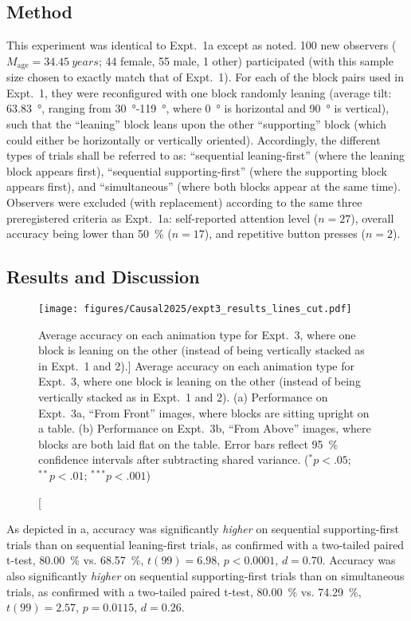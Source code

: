 \subsection{Method}
This experiment was identical to Expt.~1a except as noted.  100 new observers ($M_\text{age} = \qty{34.45}{years}$; 44 female, 55 male, 1 other) participated (with this sample size chosen to exactly match that of Expt.~1).  For each of the block pairs used in Expt.~1, they were reconfigured with one block randomly leaning (average tilt: \qty{63.83}{\degree}, ranging from \qty{30}{\degree}-\qty{119}{\degree}, where \qty{0}{\degree} is horizontal and \qty{90}{\degree} is vertical), such that the “leaning” block leans upon the other “supporting” block (which could either be horizontally or vertically oriented).  Accordingly, the different types of trials shall be referred to as: “sequential leaning-first” (where the leaning block appears first), “sequential supporting-first” (where the supporting block appears first), and “simultaneous” (where both blocks appear at the same time). Observers were excluded (with replacement) according to the same three preregistered criteria as Expt.~1a: self-reported attention level ($n = 27$), overall accuracy being lower than \qty{50}{\percent} ($n = 17$), and repetitive button presses ($n = 2$).
\subsection{Results and Discussion}
\begin{figure}[ht]
    \centering
    \texttt{[image: figures/Causal2025/expt3\_results\_lines\_cut.pdf]}
    \caption
    [Average accuracy on each animation type for Expt.~3, where one block is leaning on the other (instead of being vertically stacked as in Expt.~1 and 2).]
    {Average accuracy on each animation type for Expt.~3, where one block is leaning on the other (instead of being vertically stacked as in Expt.~1 and 2).  (a) Performance on Expt.~3a, “From Front” images, where blocks are sitting upright on a table.  (b) Performance on Expt.~3b, “From Above” images, where blocks are both laid flat on the table.  Error bars reflect \qty{95}{\percent} confidence intervals after subtracting shared variance. ($^{*}p < .05$; $^{**}p < .01$;  $^{***}p < .001$)}
    \label{fig:CausalHist_6}
\end{figure}
As depicted in a, accuracy was significantly \textit{higher} on sequential supporting-first trials than on sequential leaning-first trials, as confirmed with a two-tailed paired t-test, \qty{80.00}{\percent} vs. \qty{68.57}{\percent}, $t(99) = 6.98$, $p < 0.0001$, $d = 0.70$.  Accuracy was also significantly \textit{higher} on sequential supporting-first trials than on simultaneous trials, as confirmed with a two-tailed paired t-test, \qty{80.00}{\percent} vs. \qty{74.29}{\percent}, $t(99) = 2.57$, $p = 0.0115$, $d = 0.26$.

